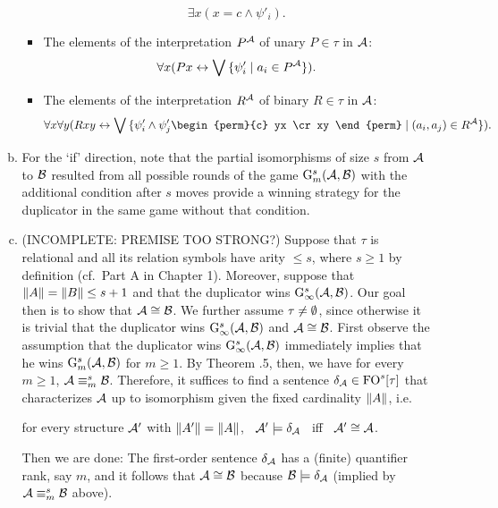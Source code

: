 \begin{enumerate}[1.]
\begin{enumerate}[(a)]
\begin{itemize}
\[
\exists x (x = c \land \psi'_i).
\]
\item The elements of the interpretation $P^{\mathcal{A}}$ of unary $P \in \tau$ in $\mathcal{A}$:
\[
\forall x (Px \leftrightarrow \bigvee {\{\psi'_i \mid a_i \in P^{\mathcal{A}}\}}).
\]
\item The elements of the interpretation $R^{\mathcal{A}}$ of binary $R \in \tau$ in $\mathcal{A}$:
\[
\forall x \forall y (Rxy \liff \blor \setm{\psi'_i \land \psi'_j\begin{perm}{c} yx \cr xy \end{perm}}{(a_i, a_j) \in \intpr{R}{\strct{A}}}).
\]
\end{itemize}
\item For the `if' direction, note that the partial isomorphisms of size $s$ from $\mathcal{A}$ to $\mathcal{B}$ resulted from all possible rounds of the game $\game[s]{m}(\strct{A}, \strct{B})$ with the additional condition after $s$ moves provide a winning strategy for the duplicator in the same game without that condition.
\item (INCOMPLETE: PREMISE TOO STRONG?) Suppose that $\tau$ is relational and all its relation symbols have arity $\leq s$, where $s \geq 1$ by definition (cf.\ Part A in Chapter 1). Moreover, suppose that $\|A\| = \|B\| \leq s + 1$ and that the duplicator wins $\game[s]{\infty}(\strct{A}, \strct{B})$. Our goal then is to show that $\strct{A} \isom \strct{B}$. We further assume $\tau \neq \emptyset$, since otherwise it is trivial that the duplicator wins $\game[s]{\infty}(\strct{A}, \strct{B})$ and $\strct{A} \isom \strct{B}$.
\newpar
First observe the assumption that the duplicator wins $\game[s]{\infty}(\strct{A}, \strct{B})$ immediately implies that he wins $\game[s]{m}(\strct{A}, \strct{B})$ for $m \geq 1$. By Theorem \thesection.5, then, we have for every $m \geq 1$, $\mathcal{A} \equiv^s_m \mathcal{B}$. Therefore, it suffices to find a sentence $\delta_\strct{A} \in \folog[s]\of{\tau}$ that characterizes $\mathcal{A}$ up to isomorphism given the fixed cardinality $\|A\|$, i.e.
\begin{center}
for every structure $\mathcal{A}'$ with $\|A'\| = \|A\|$, \ $\mathcal{A}' \models \delta_{\mathcal{A}}$ \ iff \ $\strct{A}' \isom \strct{A}$.
\end{center}
Then we are done: The first-order sentence $\delta_{\mathcal{A}}$ has a (finite) quantifier rank, say $m$, and it follows that $\strct{A} \isom \strct{B}$ because $\mathcal{B} \models \delta_{\mathcal{A}}$ (implied by $\mathcal{A} \equiv^s_m \mathcal{B}$ above).

\end{enumerate}
\end{enumerate}

